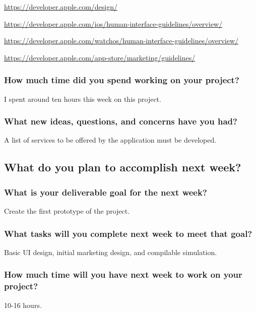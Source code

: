 \documentclass[letterpaper]{article}            %
\begin{document}
\url{https://developer.apple.com/design/}

\url{https://developer.apple.com/ios/human-interface-guidelines/overview/}

\url{https://developer.apple.com/watchos/human-interface-guidelines/overview/}

\url{https://developer.apple.com/app-store/marketing/guidelines/}

\subsubsection{How much time did you spend working on your project?}

I spent around ten hours this week on this project.

\subsubsection{What new ideas, questions, and concerns have you had?}

A list of services to be offered by the application must be developed.


\subsection{What do you plan to accomplish next week?}

\subsubsection{What is your deliverable goal for the next week?}

Create the first prototype of the project.

\subsubsection{What tasks will you complete next week to meet that goal?}

Basic UI design, initial marketing design, and compilable simulation.

\subsubsection{How much time will you have next week to work on your project?}

10-16 hours.
\end{document}
